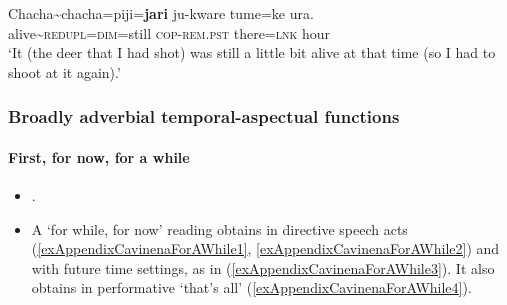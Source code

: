 \begin{exe}
	\ex
	\gll Chacha\sim{}chacha=piji=\textbf{jari} ju-kware tume=ke ura.\\ 
	alive\sim{}\textsc{redupl}=\textsc{dim}=still \textsc{cop}-\textsc{rem}.\textsc{pst} there=\textsc{lnk} hour\\
\glt \lq It (the deer that I had shot) was still a little bit alive at that time (so I had to shoot at it again).\rq{ }\parencite[388]{Guillaume2008}

\end{exe}


\subsubsection{Broadly adverbial temporal-aspectual functions}
\paragraph{First, for now, for a while}\label{appendixCavinenaFirst}
\begin{itemize}
	\item \textcite[662–663]{Guillaume2008}.
	\item A \lq for while, for now\rq{ }reading obtains in directive speech acts (\ref{exAppendixCavinenaForAWhile1}, \ref{exAppendixCavinenaForAWhile2}) and with future time settings, as in (\ref{exAppendixCavinenaForAWhile3}). It also obtains in performative \lq that's all\rq{ }(\ref{exAppendixCavinenaForAWhile4}).
\end{itemize}

